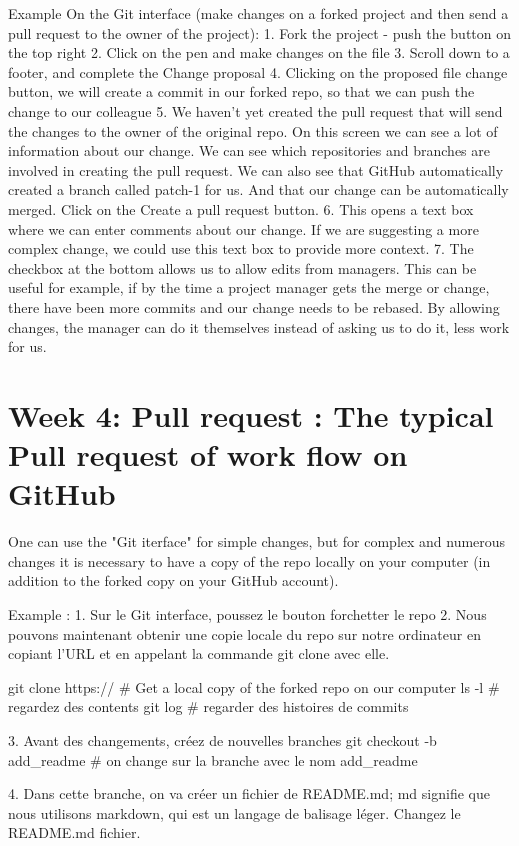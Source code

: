 \documentclass[11pt, onecolumn]{article}
\begin{document}
Example 
On the Git interface (make changes on a forked project and then send a pull request to the owner of the project):
1. Fork the project - push the button on the top right
2. Click on the pen and make changes on the file
3. Scroll down to a footer, and complete the Change proposal
4. Clicking on the proposed file change button, we will create a commit in our forked repo, so that we can push the change to our colleague
5. We haven't yet created the pull request that will send the changes to the owner of the original repo. On this screen we can see a lot of information about our change. We can see which repositories and branches are involved in creating the pull request. We can also see that GitHub automatically created a branch called patch-1 for us. And that our change can be automatically merged. Click on the Create a pull request button.
6. This opens a text box where we can enter comments about our change.
If we are suggesting a more complex change, we could use this text box to provide more context.
7. The checkbox at the bottom allows us to allow edits from managers. This can be useful for example, if by the time a project manager gets the merge or change, there have been more commits and our change needs to be rebased. By allowing changes, the manager can do it themselves instead of asking us to do it, less work for us.


\section{Week 4: Pull request : The typical Pull request of work flow on GitHub}

One can use the "Git iterface" for simple changes, but for complex and numerous changes it is necessary to have a copy of the repo locally on your computer (in addition to the forked copy on your GitHub account). 


Example :
1. Sur le Git interface, poussez le bouton forchetter le repo
2. Nous pouvons maintenant obtenir une copie locale du repo sur notre ordinateur en copiant l'URL et en appelant la commande git clone avec elle. 

git clone https://    # Get a local copy of the forked repo on our computer  
ls -l   # regardez des contents 
git log   # regarder des histoires de commits

3. Avant des changements, créez de nouvelles branches
git checkout -b add_readme    # on change sur la branche avec le nom add_readme

4. Dans cette branche, on va créer un fichier de README.md; md signifie que nous utilisons markdown, qui est un langage de balisage léger. Changez le README.md fichier.
\end{document}
